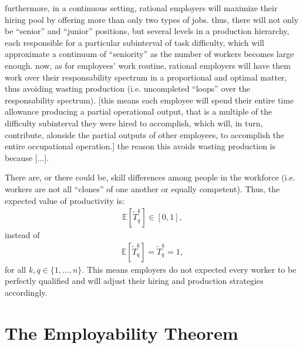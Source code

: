 \documentclass[hidelinks, nonatbib]{elsarticle}
\begin{document}
furthermore, in a continuous setting, rational employers will maximize their hiring pool by offering more than only two types of jobs. thus, there will not only be ``senior'' and ``junior'' positions, but several levels in a production hierarchy, each responsible for a particular subinterval of task difficulty, which will approximate a continuum of ``seniority'' as the number of workers becomes large enough.
now, as for employees' work routine, rational employers will have them work over their responsability spectrum in a proportional and optimal matter, thus avoiding wasting production (i.e. uncompleted ``loops'' over the responsability spectrum). [this means each employee will spend their entire time allowance producing a partial operational output, that is a multiple of the difficulty subinterval they were hired to accomplish, which will, in turn, contribute, alonside the partial outputs of other employees, to accomplish the entire occupational operation.]
the reason this avoids wasting production is because [...].

\begin{axiom}
    There are, or there could be, skill differences among people in the workforce (i.e. workers are not all ``clones'' of one another or equally competent). Thus, the expected value of productivity is:
    \begin{gather}
        \mathbb{E}[
            \tilde{T}_{q}^{k}
        ]
        \in
        [0,1]
        ,
    \end{gather}
    instead of 
    \begin{gather}
        \mathbb{E}[
            \tilde{T}_{q}^{k}
        ]
        =
        \tilde{T}_{q}^{k}
        = 1
        ,
    \end{gather}
    for all $k,q \in \{1, \dots, n\}$. This means employers do not expected every worker to be perfectly qualified and will adjust their hiring and production strategies accordingly.
\end{axiom}


\section{The Employability Theorem}
\end{document}
